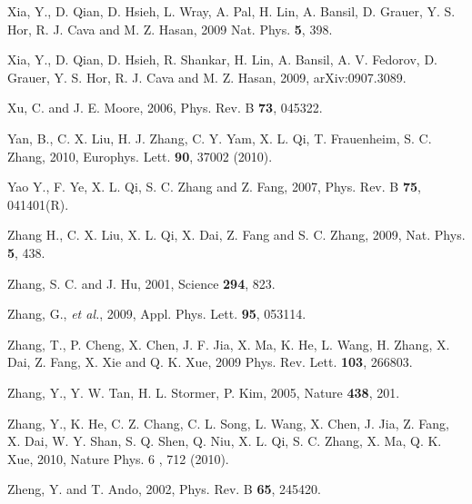 \documentclass[twocolumn,floatfix,showpacs,rmp,aps]{revtex4}
\begin{document}
\begin{thebibliography}{99}
		Xia, Y., D. Qian, D. Hsieh, L. Wray, A. Pal, H. Lin, A. Bansil, D. Grauer, Y. S. Hor,
		R. J. Cava and M. Z. Hasan, 2009
		Nat. Phys. {\bf 5}, 398.
		
		Xia, Y., D. Qian, D. Hsieh, R. Shankar, H. Lin, A. Bansil, A. V. Fedorov, D. Grauer,
		Y. S. Hor, R. J. Cava and M. Z. Hasan, 2009,
		arXiv:0907.3089.
		
		Xu, C. and J. E. Moore, 2006,
		Phys. Rev. B {\bf 73}, 045322.
		
		Yan, B., C. X. Liu, H. J. Zhang, C. Y. Yam, X. L. Qi, T. Frauenheim, S. C. Zhang, 2010,
		Europhys. Lett. {\bf 90}, 37002 (2010).
		
		Yao Y., F. Ye, X. L. Qi, S. C. Zhang and Z. Fang, 2007,
		Phys. Rev. B {\bf 75}, 041401(R).
		
		Zhang H., C. X. Liu, X. L. Qi, X. Dai, Z. Fang and S. C. Zhang, 2009,
		Nat. Phys. {\bf 5}, 438.
		
		Zhang, S. C. and J. Hu, 2001,
		Science {\bf 294}, 823.
		
		Zhang, G., \emph{et al.}, 2009,
		Appl. Phys. Lett. {\bf 95}, 053114.
		
		Zhang, T., P. Cheng, X. Chen, J. F. Jia, X. Ma, K. He, L. Wang, H. Zhang, X. Dai, Z. Fang,
		X. Xie and Q. K. Xue, 2009
		Phys. Rev. Lett. {\bf 103}, 266803.
		
		Zhang, Y., Y. W. Tan, H. L. Stormer, P. Kim, 2005,
		Nature {\bf 438}, 201.
		
		Zhang, Y., K. He, C. Z. Chang, C. L. Song, L. Wang, X. Chen, J. Jia, Z. Fang, X. Dai, W. Y. Shan,
		S. Q. Shen, Q. Niu, X. L. Qi, S. C. Zhang, X. Ma, Q. K. Xue, 2010,
		Nature Phys. 6 , 712 (2010).
		
		Zheng, Y. and T. Ando, 2002,
		Phys. Rev. B {\bf 65}, 245420.
		

\end{thebibliography}
\end{document}
